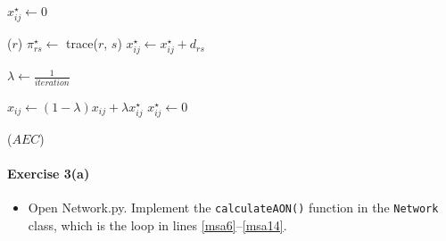 \documentclass[11pt]{article}
\newcommand{\A}{\mathcal{A}}
\newcommand{\Z}{\mathcal{Z}}
\begin{document}
\begin{algorithmic}[1]
	\For{$(i,j)\in\A$} 
	\State $x^\star_{ij} \leftarrow 0$
	\EndFor
	
	\vspace{0.5\baselineskip}
	
	 \label{msa5}
	\For{$r\in\Z$}  \label{msa6}
	($r$) 
	\For{$s\in\Z$}
	\State $\pi^\star_{rs} \leftarrow$ {\sc trace($r$, $s$)}
	 
	\State $x^\star_{ij} \leftarrow x^\star_{ij} + d_{rs}$ \label{msa11}
	\EndFor
	\EndFor
	\EndFor \label{msa14}
	
	\vspace{0.5\baselineskip}
	
	
	\State $\lambda \leftarrow \frac{1}{iteration}$  \label{msa15}
	
	\vspace{0.5\baselineskip}
	
	\For{$(i,j)\in\A$}  \label{msa16}
	\State $x_{ij} \leftarrow (1-\lambda)x_{ij} + \lambda x^\star_{ij}$ \label{msa17}
	\State $x^\star_{ij}\leftarrow 0$ \label{msa18}
	\EndFor
	
	\vspace{0.5\baselineskip}
	
	($AEC$) 
	
	\EndFor
	\EndProcedure
\end{algorithmic}





\paragraph*{Exercise 3(a)} 
\begin{itemize}

	
	\item Open Network.py. Implement the \texttt{calculateAON()} function in the \texttt{Network} class, which is the loop in lines \ref{msa6}--\ref{msa14}. 

\end{itemize}
\end{document}
